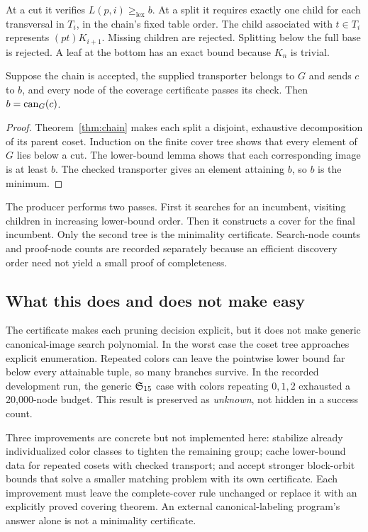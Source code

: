 At a cut it verifies $L(p,i)\geq_{\mathrm{lex}} b$. At a split it requires exactly one child for each transversal in $T_i$, in the chain's fixed table order. The child associated with $t\in T_i$ represents $(pt)K_{i+1}$. Missing children are rejected. Splitting below the full base is rejected. A leaf at the bottom has an exact bound because $K_n$ is trivial.

\begin{theorem}
\label{thm:canonical}
Suppose the chain is accepted, the supplied transporter belongs to $G$ and sends $c$ to $b$, and every node of the coverage certificate passes its check. Then $b=\operatorname{can}_G(c)$.
\end{theorem}
\begin{proof}
Theorem~\ref{thm:chain} makes each split a disjoint, exhaustive decomposition of its parent coset. Induction on the finite cover tree shows that every element of $G$ lies below a cut. The lower-bound lemma shows that each corresponding image is at least $b$. The checked transporter gives an element attaining $b$, so $b$ is the minimum.
\end{proof}

The producer performs two passes. First it searches for an incumbent, visiting children in increasing lower-bound order. Then it constructs a cover for the final incumbent. Only the second tree is the minimality certificate. Search-node counts and proof-node counts are recorded separately because an efficient discovery order need not yield a small proof of completeness.

\subsection{What this does and does not make easy}
The certificate makes each pruning decision explicit, but it does not make generic canonical-image search polynomial. In the worst case the coset tree approaches explicit enumeration. Repeated colors can leave the pointwise lower bound far below every attainable tuple, so many branches survive. In the recorded development run, the generic $\mathfrak S_{15}$ case with colors repeating $0,1,2$ exhausted a 20,000-node budget. This result is preserved as \emph{unknown}, not hidden in a success count.

Three improvements are concrete but not implemented here: stabilize already individualized color classes to tighten the remaining group; cache lower-bound data for repeated cosets with checked transport; and accept stronger block-orbit bounds that solve a smaller matching problem with its own certificate. Each improvement must leave the complete-cover rule unchanged or replace it with an explicitly proved covering theorem. An external canonical-labeling program's answer alone is not a minimality certificate.

